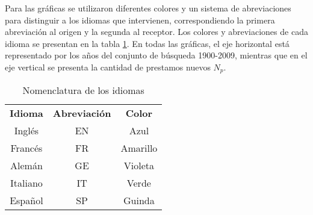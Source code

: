 {\begin{itemize}
\end{itemize}





Para las gráficas se utilizaron diferentes colores  y un sistema de abreviaciones para distinguir a los idiomas que intervienen, correspondiendo la primera abreviación al origen y la segunda al receptor. Los colores y abreviaciones de cada idioma se presentan  en la tabla \ref{tab.idcolor}. En todas las gráficas, el eje horizontal está representado por los años del conjunto de búsqueda 1900-2009,  mientras que en el eje vertical se presenta la
cantidad de prestamos nuevos $N_{p}$. 


\begin{table} %
	\centering
	\begin{tabular}{ccc}
		\textbf{Idioma} & \textbf{Abreviación} & \textbf{Color} \\
		Inglés          & EN                   & Azul           \\
		Francés         & FR                   & Amarillo       \\
		Alemán          & GE                   & Violeta        \\
		Italiano        & IT                   & Verde          \\
		Español         & SP                   & Guinda        
	\end{tabular}
	\caption{Nomenclatura de los idiomas}
	\label{tab.idcolor}
\end{table} %




	

}

